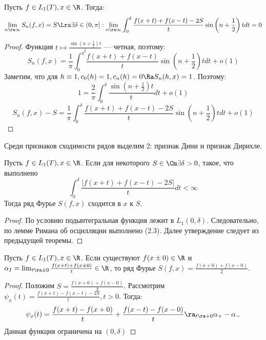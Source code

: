 
\begin{theorem}
    Пусть \(f \in L_1(T), x \in \R\). Тогда:
    \begin{equation}
        \lim_{n \ra \infty} S_n(f, x) = S \Lra \exists \delta \in (0, \pi]: \lim_{n \ra \infty} \int_0^\delta \frac{f(x + t) + f(x - t) - 2S}{t}\sin\left( n + \frac{1}{2} \right)t dt = 0
    \end{equation}
\end{theorem}
\begin{proof}
    Функция \(t \mapsto \frac{\sin\left( n + \frac{1}{2} \right)t}{t}\) --- четная, поэтому:
    \[S_n(f, x) = \frac{1}{\pi}\int_0^\pi \frac{f(x + t) + f(x - t)}{t}\sin\left( n + \frac{1}{2} \right)tdt + o(1)\]
    Заметим, что для \(h \equiv 1, c_0(h) = 1, c_n(h) = 0 \Ra S_n(h, x) = 1\). Поэтому:
    \[1 = \frac{2}{\pi} \int_0^\delta \frac{\sin\left( n + \frac{1}{2} \right)t}{t}dt + o(1)\]
    \[S_n(f, x) - S = \frac{1}{\pi}\int_0^\delta \frac{f(x + t) + f(x - t) - 2S}{t}\sin\left( n + \frac{1}{2} \right)tdt + o(1)\]
\end{proof}

Среди признаков сходимости рядов выделим 2: признак Дини и признак Дирихле.

\begin{proposition}
    Пусть \(f \in L_1(T), x \in \R\). Если для некоторого \(S \in \Cm \exists \delta > 0\), такое, что выполнено
    \[\int_0^\delta \frac{|f(x + t) + f(x - t) - 2S|}{t}dt < \infty\]
    Тогда ряд Фурье \(S(f, x)\) сходится в \(x\) к \(S\).
\end{proposition}
\begin{proof}
    По условию подынтегральная функция лежит в \(L_1(0, \delta)\). Следовательно, по лемме Римана об осцилляции выполнено (2.3). Далее утверждение следует из предыдущей теоремы.
\end{proof}

\begin{corollary}
    Пусть \(f \in L_1(T), x \in \R\). Если существуют \(f(x \pm 0) \in \R\) и \(\alpha_I = \lim_{t \ra \pm 0} \frac{f(x + t) + f(x \pm 0)}{t} \in \R\), то ряд Фурье \(S(f, x) = \frac{f(x + 0) + f(x - 0)}{2}\).
\end{corollary}
\begin{proof}
    Положим \(S = \frac{f(x + 0) + f(x - 0)}{2}\). Рассмотрим \(\psi_x(t) = \frac{f(x + t) - f(x - t) - 2S}{t}, t > 0\). Тогда:
    \[\psi_x(t) = \frac{f(x + t) - f(x + 0)}{t} + \frac{f(x - t) - f(x - 0)}{t} \ra_{t \ra +0} \alpha_+ - \alpha_-\]
    Данная функция ограничена на \((0, \delta)\)
\end{proof}

